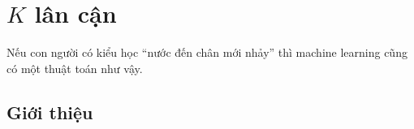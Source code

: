 \chapter{$K$ lân cận}
\label{cha:knn}


Nếu con người có kiểu học ``nước đến chân mới nhảy'' thì machine
learning cũng có một thuật toán như vậy.


\section{Giới thiệu}







